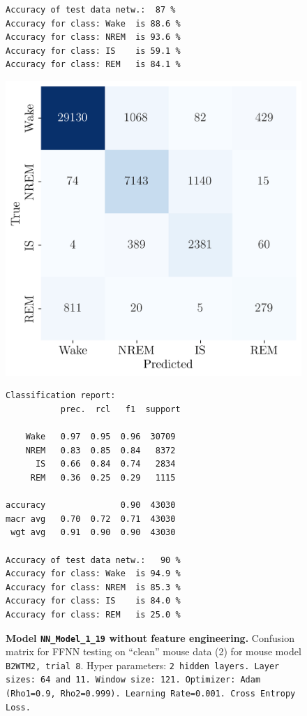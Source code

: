 \documentclass{article}
\begin{document}
\begin{figure}[H]
\begin{tcolorbox}[colframe=black, colback=white, sharp corners, boxrule=0.2mm, width=\textwidth]
\begin{minipage}[t]{0.48\textwidth}
{\begin{verbatim}
Accuracy of test data netw.:  87 %
Accuracy for class: Wake  is 88.6 %
Accuracy for class: NREM  is 93.6 %
Accuracy for class: IS    is 59.1 %
Accuracy for class: REM   is 84.1 %
            \end{verbatim}}
        \end{minipage}
        \hfill
        \begin{minipage}[t]{0.48\textwidth}
            \centering
            \includegraphics[width=\linewidth]{figures/confusion_matrix_model_19.png}
            \caption{\textbf{Model \texttt{NN\_Model\_1\_19} without feature engineering.} Confusion matrix for FFNN testing on ``clean'' mouse data (2) for mouse model \texttt{B2WTM2, trial 8}. Hyper parameters: \texttt{2 hidden layers. Layer sizes: 64 and 11. Window size: 121. Optimizer: Adam (Rho1=0.9, Rho2=0.999). Learning Rate=0.001. Cross Entropy Loss.}}
            \label{fig:ffnn_fe_cm2}
            \vspace{0.5cm}
            {\small
            \begin{verbatim}
Classification report:
           prec.  rcl   f1  support

    Wake   0.97  0.95  0.96  30709
    NREM   0.83  0.85  0.84   8372
      IS   0.66  0.84  0.74   2834
     REM   0.36  0.25  0.29   1115

accuracy               0.90  43030
macr avg   0.70  0.72  0.71  43030
 wgt avg   0.91  0.90  0.90  43030

Accuracy of test data netw.:   90 %
Accuracy for class: Wake  is 94.9 %
Accuracy for class: NREM  is 85.3 %
Accuracy for class: IS    is 84.0 %
Accuracy for class: REM   is 25.0 %
            \end{verbatim}}
        \end{minipage}
    \end{tcolorbox}
\end{figure}
\end{document}
